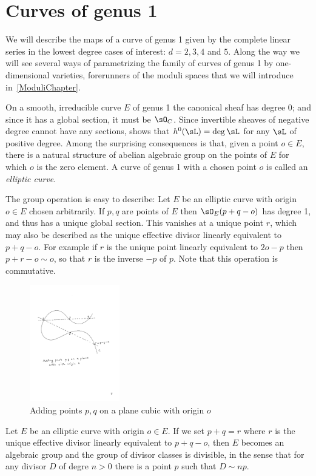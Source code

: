 \section{Curves of genus 1}

We will describe the maps of a curve of genus 1 given by
the complete linear series in the lowest degree cases of interest: $d =  2, 3, 4$ and $5$. Along the
way we will see several ways of parametrizing the family of curves of genus 1 by one-dimensional varieties,
forerunners of the moduli spaces that we will introduce in~\ref{ModuliChapter}.


On a smooth, irreducible curve $E$ of genus 1 the canonical sheaf has degree 0; and since it has a global section, it must be $\sO_C$.
Since invertible sheaves of negative degree cannot have any sections, \trr shows that
$h^0( \sL) = \deg \sL$ for any $\sL$ of positive degree. Among the surprising consequences is that, given
a point $o\in E$, there is a natural structure of abelian algebraic group on the points of $E$ for which $o$
is the zero element. A curve of genus 1 with a chosen point $o$ is called an \emph{elliptic curve}.


The group operation is easy to describe:
Let $E$ be an elliptic curve with origin $o\in E$ chosen arbitrarily. If $p,q$ are points of $E$ then $\sO_E(p+q-o)$ has degree 1, and
thus has a unique global section. This vanishes at a unique point $r$, which may also be described as the unique
effective divisor linearly equivalent to $p+q-o$. For example if $r$ is the  unique point
linearly equivalent to $2o-p$ then $p+r-o\sim o$, so that $r$ is the inverse $-p$ of $p$. Note that this operation is commutative.

\begin{figure}
 \caption{Adding points $p, q$ on a plane cubic with origin $o$}
\centerline {\includegraphics[height=2in]{"Fig3.1.pdf"}}
\end{figure}

\begin{proposition}\label{group law} Let $E$ be an elliptic curve with origin $o\in E$.
If we set $p+q = r$ where $r$ is the unique effective divisor linearly equivalent to $p+q-o$, then $E$ becomes an algebraic group
and the group of divisor classes is divisible, in the sense that for any divisor $D$ of degre $n>0$
 there is a point $p$ such that $D\sim np$.
 \end{proposition}

